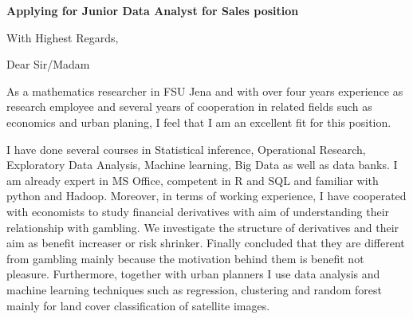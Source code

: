 \documentclass[12pt,a4paper,sans]{moderncv}        %
\title{}                               %
\begin{document}
\date{May 17, 2016}
\opening{\textbf{Applying for  Junior Data Analyst for Sales position}}
\closing{With Highest Regards,}
\makelettertitle

Dear Sir/Madam

As a mathematics researcher in FSU Jena and with over four years experience as research employee and several years of cooperation in related fields such as economics and urban planing, I feel that I am an excellent fit for this position.



I have done several courses in Statistical inference, Operational Research, Exploratory Data Analysis,  Machine learning, Big Data as well as data banks. I am already expert in MS Office, competent in R and SQL and familiar with python and Hadoop. %
Moreover, in terms of working experience, I have cooperated with economists to study financial derivatives with aim of understanding their relationship with gambling. We investigate the structure of derivatives and their aim as benefit increaser or risk shrinker. Finally concluded that they are different from gambling mainly because the motivation behind them is benefit not pleasure.   
Furthermore, together with urban planners I use data analysis and machine learning techniques such as regression, clustering and random forest mainly for land cover classification of satellite images.

\end{document}
